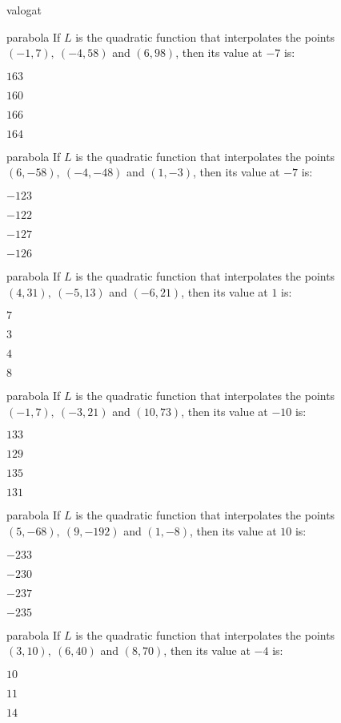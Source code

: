 \documentclass[12pt]{article}
\begin{document}
\begin{quiz}{valogat}
\begin{multi}{parabola}
If $L$ is the quadratic function that interpolates the points
$(-1,7),\ (-4,58)$ and $(6,98)$, then its value at $-7$ is:
\item* $ 163 $
\item  $ 160 $
\item  $ 166 $
\item  $ 164 $
\end{multi}
\begin{multi}{parabola}
If $L$ is the quadratic function that interpolates the points
$(6,-58),\ (-4,-48)$ and $(1,-3)$, then its value at $-7$ is:
\item* $ -123 $
\item  $ -122 $
\item  $ -127 $
\item  $ -126 $
\end{multi}
\begin{multi}{parabola}
If $L$ is the quadratic function that interpolates the points
$(4,31),\ (-5,13)$ and $(-6,21)$, then its value at $1$ is:
\item* $ 7 $
\item  $ 3 $
\item  $ 4 $
\item  $ 8 $
\end{multi}
\begin{multi}{parabola}
If $L$ is the quadratic function that interpolates the points
$(-1,7),\ (-3,21)$ and $(10,73)$, then its value at $-10$ is:
\item* $ 133 $
\item  $ 129 $
\item  $ 135 $
\item  $ 131 $
\end{multi}
\begin{multi}{parabola}
If $L$ is the quadratic function that interpolates the points
$(5,-68),\ (9,-192)$ and $(1,-8)$, then its value at $10$ is:
\item* $ -233 $
\item  $ -230 $
\item  $ -237 $
\item  $ -235 $
\end{multi}
\begin{multi}{parabola}
If $L$ is the quadratic function that interpolates the points
$(3,10),\ (6,40)$ and $(8,70)$, then its value at $-4$ is:
\item* $ 10 $
\item  $ 11 $
\item  $ 14 $

\end{multi}
\end{quiz}
\end{document}
